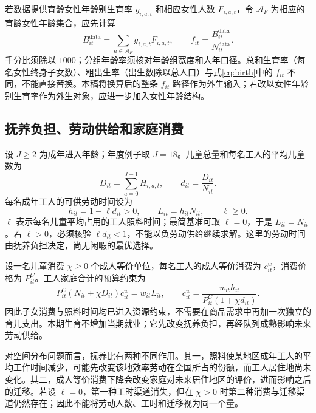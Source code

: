 \documentclass[UTF8,a4paper,zihao=-4,fontset=windows]{ctexart}
\numberwithin{equation}{section}
\newcommand{\pc}{P^{C}}
\begin{document}
若数据提供育龄女性年龄别生育率 $g_{i,a,t}$ 和相应女性人数 $F_{i,a,t}$，令 $\mathcal A_F$ 为相应的育龄女性年龄集合，应先计算
\begin{equation}
 B_{it}^{\mathrm{data}}=\sum_{a\in\mathcal A_F}g_{i,a,t}F_{i,a,t},
 \qquad f_{it}=\frac{B_{it}^{\mathrm{data}}}{N_{it}^{\mathrm{data}}}.
 \label{eq:fertility-data}
\end{equation}
千分比须除以 $1000$；分组年龄率须核对年龄组宽度和人年口径。总和生育率（每名女性终身子女数）、粗出生率（出生数除以总人口）与式\eqref{eq:birth}中的 $f_{it}$ 不同，不能直接替换。本稿将换算后的整条 $f_{it}$ 路径作为外生输入；若改以女性年龄别生育率作为外生对象，应进一步加入女性年龄结构。

\subsection{抚养负担、劳动供给和家庭消费}
设 $J\geq2$ 为成年进入年龄；年度例子取 $J=18$。儿童总量和每名工人的平均儿童数为
\begin{equation}
 D_{it}=\sum_{a=0}^{J-1}H_{i,a,t},\qquad d_{it}=\frac{D_{it}}{N_{it}}.
 \label{eq:dependency}
\end{equation}
每名成年工人的可供劳动时间设为
\begin{equation}
 h_{it}=1-\ell d_{it}>0,\qquad L_{it}=h_{it}N_{it},\qquad \ell\geq0.
 \label{eq:labor-supply}
\end{equation}
$\ell$ 表示每名儿童平均占用的工人照料时间；最简基准可取 $\ell=0$，于是 $L_{it}=N_{it}$。若 $\ell>0$，必须核验 $\ell d_{it}<1$，不能以负劳动供给继续求解。这里的劳动时间由抚养负担决定，尚无闲暇的最优选择。

设一名儿童消费 $\chi\geq0$ 个成人等价单位，每名工人的成人等价消费为 $c^w_{it}$，消费价格为 $\pc_{it}$。工人家庭合计的预算约束为
\begin{equation}
 \pc_{it}(N_{it}+\chi D_{it})c^w_{it}=w_{it}L_{it},
 \qquad
 c^w_{it}=\frac{w_{it}h_{it}}{\pc_{it}(1+\chi d_{it})}.
 \label{eq:worker-budget}
\end{equation}
因此子女消费与照料时间均已进入资源约束，不需要在商品需求中再加一次独立的育儿支出。本期生育不增加当期就业；它先改变抚养负担，再经队列成熟影响未来劳动供给。

对空间分布问题而言，抚养比有两种不同作用。其一，照料使某地区成年工人的平均工作时间减少，可能先改变该地效率劳动在全国所占的份额，而工人居住地尚未变化。其二，成人等价消费下降会改变家庭对未来居住地区的评价，进而影响之后的迁移。若设 $\ell=0$，第一种工时渠道消失，但在 $\chi>0$ 时第二种消费与迁移渠道仍然存在；因此不能将劳动人数、工时和迁移视为同一个量。
\end{document}
